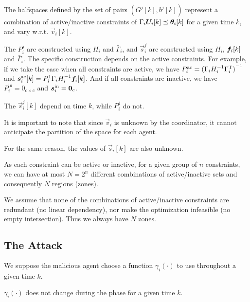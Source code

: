 \documentclass{ifacconf}  %
\begin{document}
The halfspaces defined by the set of pairs $(G^{j}[k],b^{j}[k])$ represent a combination of active/inactive constraints of ${\bar{\Gamma}_{i}\Uik\preceq\thetaik}$ for a given time $k$, and vary w.r.t. $\vec{v}_{i}[k]$.

The $P_{i}^{j}$ are constructed using $H_{i}$ and $\bar{\Gamma}_{i}$, and $\vec{s}_{i}^{j}$ are constructed using $H_{i}$, $\fik$ and $\bar{\Gamma}_{i}$. The specific construction depends on the active constraints.
For example, if we take the case when all constraints are active, we have ${P_{i}^{\text{ac}}={(\relax{\Gamma}_{i}H_{i}^{-1}\relax{\Gamma}_{i}^{\mathrm{T}})}^{-1}}$ and ${\vec{s}_{i}^{\text{ac}}[k]=P_{i}^{1}\bar{\Gamma}_{i}H_{i}^{-1}\fik}$.
And if all constraints are inactive, we have ${P_{i}^{\text{in}}=0_{c\times c}}$ and ${\boldsymbol{s}_{i}^{\text{in}}=\mathbf{0}_{c}}$.\\
\begin{remark}\label{rmk:P_constant}
The $\vec{s}_{i}^{j}[k]$ depend on time $k$, while $P_{i}^{j}$ do not.
\end{remark}


\begin{challenge}\label{ch:partition_unknown}
  It is important to note that since $\vec{v}_{i}$ is unknown by the coordinator, it cannot anticipate the partition of the space for each agent.
\end{challenge}
\begin{challenge}\label{ch:zone_unknown}
 For the same reason, the values of $\vec{s}_{i}[k]$ are also unknown.
\end{challenge}

 As each constraint can be active or inactive, for a given group of $n$ constraints, we can have at most $N=2^{n}$ different combinations of active/inactive sets and consequently $N$ regions (zones).

 \begin{assumption}
   We assume that none of the combinations of active/inactive constraints are redundant (no linear dependency), nor make the optimization infeasible (no empty intersection).
   Thus we always have $N$ zones.
 \end{assumption}



\subsection{The Attack}\label{ssec:attack}
We suppose the malicious agent choose a function $\gamma_{i}(\cdot)$ to use throughout a given time $k$.
\begin{assumption}
  $\gamma_{i}(\cdot)$ does not change during the \negotiation{} phase for a given time $k$.
\end{assumption}
\end{document}
